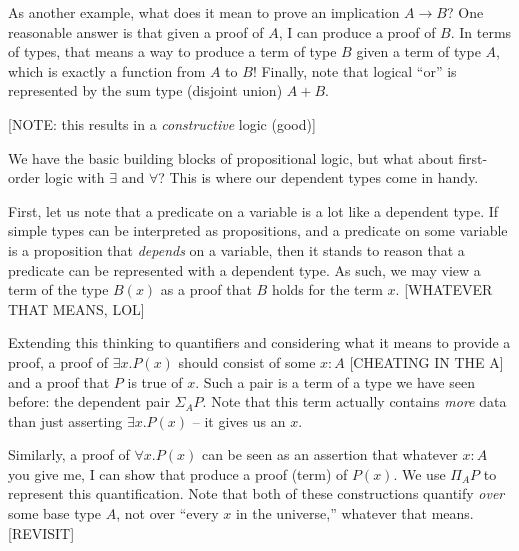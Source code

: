 \begin{table}[h!]
\centering
{}%
\hspace{.25\linewidth}
\end{table}

As another example, what does it mean to prove an implication $A \rightarrow B$?
One reasonable answer is that given a proof of $A$, I can produce a proof of
$B$. In terms of types, that means a way to produce a term of type $B$ given a
term of type $A$, which is exactly a function from $A$ to $B$! Finally, note
that logical ``or'' is represented by the sum type (disjoint union) $A + B$.

[NOTE: this results in a \emph{constructive} logic (good)]

We have the basic building blocks of propositional logic, but what about
first-order logic with $\exists$ and $\forall$? This is where our dependent
types come in handy.

First, let us note that a predicate on a variable is a lot like a dependent
type. If simple types can be interpreted as propositions, and a predicate on
some variable is a proposition that \emph{depends} on a variable, then it stands
to reason that a predicate can be represented with a dependent type. As such, we
may view a term of the type $B(x)$ as a proof that $B$ holds for the term $x$.
[WHATEVER THAT MEANS, LOL]

Extending this thinking to quantifiers and considering what it means to provide
a proof, a proof of $\exists x. P(x)$ should consist of some $x:A$ [CHEATING IN
THE A] and a proof that $P$ is true of $x$. Such a pair is a term of a type we have seen
before: the dependent pair $\Sigma_A P$. Note that this term actually contains
\emph{more} data than just asserting $\exists x. P(x)$ -- it gives us an $x$.

Similarly, a proof of $\forall x. P(x)$ can be seen as an assertion that
whatever $x:A$ you give me, I can show that produce a proof (term) of $P(x)$. We
use $\Pi_A P$ to represent this quantification. Note that both of these
constructions quantify \emph{over} some base type $A$, not over ``every $x$ in
the universe,'' whatever that means. [REVISIT]